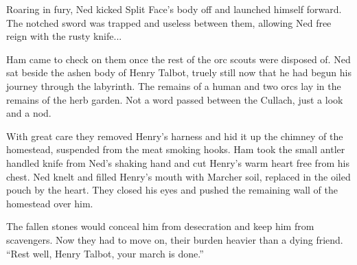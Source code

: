 Roaring in fury, Ned kicked Split Face's body off and launched himself forward. The notched sword was trapped and useless between them, allowing Ned free reign with the rusty knife...

Ham came to check on them once the rest of the orc scouts were disposed of. Ned sat beside the ashen body of Henry Talbot, truely still now that he had begun his journey through the labyrinth. The remains of a human and two orcs lay in the remains of the herb garden. Not a word passed between the Cullach, just a look and a nod.

With great care they removed Henry's harness and hid it up the chimney of the homestead, suspended from the meat smoking hooks. Ham took the small antler handled knife from Ned's shaking hand and cut Henry's warm heart free from his chest. Ned knelt and filled Henry's mouth with Marcher soil, replaced in the oiled pouch by the heart. They closed his eyes and pushed the remaining wall of the homestead over him.

The fallen stones would conceal him from desecration and keep him from scavengers. Now they had to move on, their burden heavier than a dying friend.
“Rest well, Henry Talbot, your march is done.”



